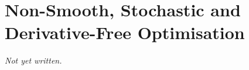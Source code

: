 \chapter{Non-Smooth, Stochastic and Derivative-Free Optimisation}\label{ch:nonsmooth-stochastic-optimisation}


\textit{Not yet written.}
